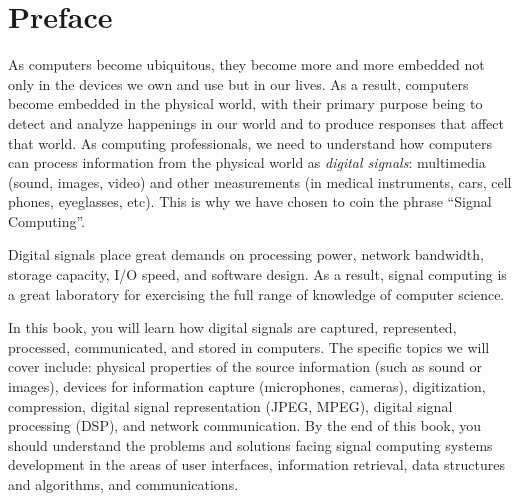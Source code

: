 
%
%
%
%
%
%

\chapter*{Preface}


As computers become ubiquitous, they become more and more embedded not
only in the devices we own and use but in our lives. As a result,
computers become embedded in the physical world, with their primary
purpose being to detect and analyze happenings in our world and to
produce responses that affect that world. As computing professionals,
we need to understand how computers can process information from the
physical world as \emph{digital signals}: multimedia (sound, images,
video) and other measurements (in medical instruments, cars, cell
phones, eyeglasses, etc). This is why we have chosen to coin the
phrase ``Signal Computing''.

Digital signals place great demands on processing power, network
bandwidth, storage capacity, I/O speed, and software design. As a
result, signal computing is a great laboratory for exercising the full
range of knowledge of computer science.

In this book, you will learn how digital signals are captured,
represented, processed, communicated, and stored in computers. The
specific topics we will cover include: physical properties of the
source information (such as sound or images), devices for information
capture (microphones, cameras), digitization, compression, digital
signal representation (JPEG, MPEG), digital signal processing (DSP),
and network communication.  By the end of this book, you should
understand the problems and solutions facing signal computing systems
development in the areas of user interfaces, information retrieval,
data structures and algorithms, and communications.

